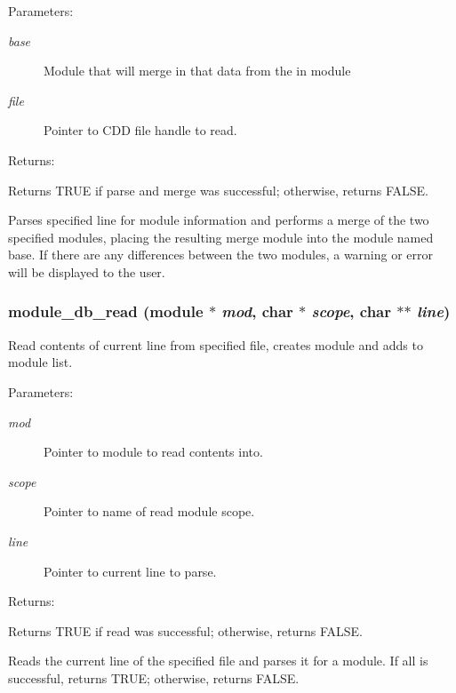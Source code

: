 \begin{Desc}
\item[Parameters: ]\par
\begin{description}
\item[{\em 
base}]Module that will merge in that data from the in module \item[{\em 
file}]Pointer to CDD file handle to read.\end{description}
\end{Desc}
\begin{Desc}
\item[Returns: ]\par
Returns TRUE if parse and merge was successful; otherwise, returns FALSE.\end{Desc}
Parses specified line for module information and performs a merge of the two  specified modules, placing the resulting merge module into the module named base. If there are any differences between the two modules, a warning or error will be displayed to the user. 
\subsubsection{ module\_\-db\_\-read ({\bf module} $\ast$ {\em mod}, char $\ast$ {\em scope}, char $\ast$$\ast$ {\em line})}\label{module_8c_a5}


Read contents of current line from specified file, creates module and adds to module list.

\begin{Desc}
\item[Parameters: ]\par
\begin{description}
\item[{\em 
mod}]Pointer to module to read contents into. \item[{\em 
scope}]Pointer to name of read module scope. \item[{\em 
line}]Pointer to current line to parse.\end{description}
\end{Desc}
\begin{Desc}
\item[Returns: ]\par
Returns TRUE if read was successful; otherwise, returns FALSE.\end{Desc}
Reads the current line of the specified file and parses it for a module. If all is successful, returns TRUE; otherwise, returns FALSE. 

